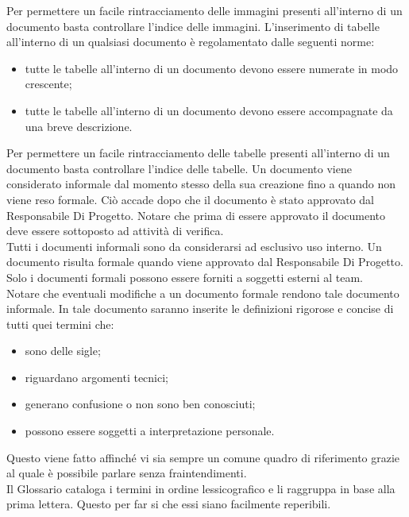 				Per permettere un facile rintracciamento delle immagini presenti all’interno di un documento basta controllare l’indice delle immagini.
				L’inserimento di tabelle all’interno di un qualsiasi documento è regolamentato dalle seguenti norme:
				\begin{itemize}
					\item tutte le tabelle all’interno di un documento devono essere numerate in modo crescente;
					\item tutte le tabelle all’interno di un documento devono essere accompagnate da una breve descrizione.
				\end{itemize}
				Per permettere un facile rintracciamento delle tabelle presenti all’interno di un documento basta controllare l’indice delle tabelle.
				Un documento viene considerato informale dal momento stesso della sua creazione fino a quando non viene reso formale. Ciò accade dopo che il documento è stato approvato dal Responsabile Di Progetto. Notare che prima di essere approvato il documento deve essere sottoposto ad attività di verifica.\\
				Tutti i documenti informali sono da considerarsi ad esclusivo uso interno.
				Un documento risulta formale quando viene approvato dal Responsabile Di Progetto. Solo i documenti formali possono essere forniti a soggetti esterni al team.\\
				Notare che eventuali modifiche a un documento formale rendono tale documento informale.
				In tale documento saranno inserite le definizioni rigorose e concise di tutti quei termini che:
				\begin{itemize}
					\item sono delle sigle;
					\item riguardano argomenti tecnici;
					\item generano confusione o non sono ben conosciuti;
					\item possono essere soggetti a interpretazione personale.
				\end{itemize}
				Questo viene fatto affinché vi sia sempre un comune quadro di riferimento grazie al quale è possibile parlare senza fraintendimenti.\\
				Il Glossario cataloga i termini in ordine lessicografico e li raggruppa in base alla prima lettera. Questo per far si che essi siano facilmente reperibili.
			 \label{sec:verbali}
